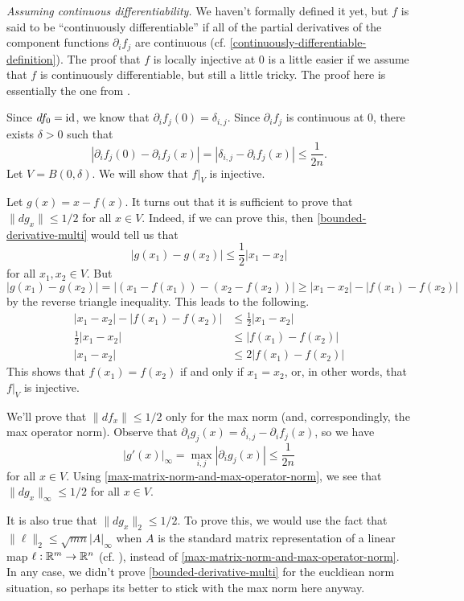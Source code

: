 \mbox{}

\noindent \textit{Assuming continuous differentiability.} We haven't formally defined it yet, but $f$ is said to be ``continuously differentiable'' if all of the partial derivatives of the component functions $\partial_i f_j$ are continuous (cf. \cref{continuously-differentiable-definition}). The proof that $f$ is locally injective at 0 is a little easier if we assume that $f$ is continuously differentiable, but still a little tricky. The proof here is essentially the one from \cite[chapter 2]{spivak_calculus}. 

Since $df_0 = \mathrm{id}$, we know that $\partial_i f_j(0) = \delta_{i,j}$. Since $\partial_i f_j$ is continuous at 0, there exists $\delta > 0$ such that 
\[ |\partial_i f_j(0) - \partial_i f_j(x)| = |\delta_{i,j} - \partial_i f_j(x)| \leq \frac{1}{2n}. \]
Let $V = B(0,\delta)$. We will show that $f|_V$ is injective. 

Let $g(x) = x - f(x)$. It turns out that it is sufficient to prove that $\|dg_x\| \leq 1/2$ for all $x \in V$. Indeed, if we can prove this, then \cref{bounded-derivative-multi} would tell us that 
\[ |g(x_1) - g(x_2)| \leq \frac{1}{2} |x_1 - x_2| \]
for all $x_1, x_2 \in V$. But
\[ |g(x_1) - g(x_2)| = |(x_1 - f(x_1)) - (x_2 - f(x_2))| \geq |x_1 - x_2| - |f(x_1) - f(x_2)| \]
by the reverse triangle inequality. This leads to the following. 
\[ \begin{aligned} |x_1 - x_2| - |f(x_1) - f(x_2)| &\leq \frac{1}{2} |x_1 - x_2| \\
\frac{1}{2}|x_1 - x_2| &\leq |f(x_1) - f(x_2)| \\
|x_1 - x_2| &\leq 2|f(x_1) - f(x_2)| \end{aligned} \]
This shows that $f(x_1) = f(x_2)$ if and only if $x_1 = x_2$, or, in other words, that $f|_V$ is injective. 

We'll prove that $\|df_x\| \leq 1/2$ only for the max norm (and, correspondingly, the max operator norm). Observe that $\partial_i g_j(x) = \delta_{i,j} - \partial_i f_j(x)$, so we have 
\[ |g'(x)|_\infty = \max_{i,j} |\partial_i g_j(x)| \leq \frac{1}{2n} \]
for all $x \in V$. Using \cref{max-matrix-norm-and-max-operator-norm}, we see that $\|dg_x\|_\infty \leq 1/2$ for all $x \in V$. 

\begin{unimportantremark}
	It is also true that $\|dg_x\|_2 \leq 1/2$. To prove this, we would use the fact that $\|\ell\|_2 \leq \sqrt{mn}|A|_\infty$ when $A$ is the standard matrix representation of a linear map $\ell : \mathbb{R}^m \to  \mathbb{R}^n$ (cf. \cite[section 2.3.2]{golub}), instead of \cref{max-matrix-norm-and-max-operator-norm}. In any case, we didn't prove \cref{bounded-derivative-multi} for the eucldiean norm situation, so perhaps its better to stick with the max norm here anyway. 
\end{unimportantremark}

